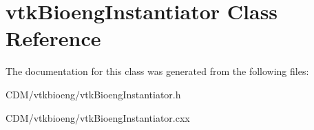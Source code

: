\hypertarget{classvtkBioengInstantiator}{
\section{vtkBioengInstantiator Class Reference}
\label{classvtkBioengInstantiator}
}


The documentation for this class was generated from the following files:\begin{DoxyCompactItemize}
\item 
CDM/vtkbioeng/vtkBioengInstantiator.h\item 
CDM/vtkbioeng/vtkBioengInstantiator.cxx\end{DoxyCompactItemize}
